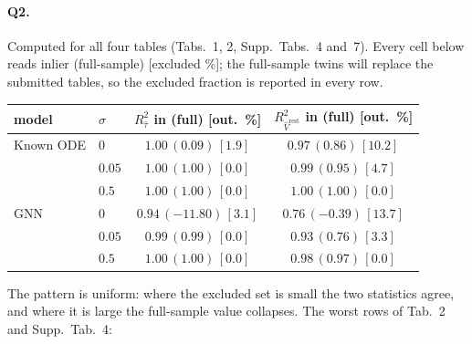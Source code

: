 
\paragraph{Q2.}
Computed for all four tables (Tabs.~1, 2, Supp.~Tabs.~4 and~7). Every cell below
reads inlier (full-sample) [excluded \%]; the full-sample twins will replace the
submitted tables, so the excluded fraction is reported in every row.

\begin{center}
{\footnotesize
\begin{tabular}{llcc}
\toprule
model & $\sigma$
  & $R^2_{\widehat{\tau}}$ in (full) [out.\ \%]
  & $R^2_{\widehat{V}^{\mathrm{rest}}}$ in (full) [out.\ \%] \\
\midrule
Known ODE & $0$    & $1.00\,(0.09)\,[1.9]$    & $0.97\,(0.86)\,[10.2]$ \\
          & $0.05$ & $1.00\,(1.00)\,[0.0]$    & $0.99\,(0.95)\,[4.7]$ \\
          & $0.5$  & $1.00\,(1.00)\,[0.0]$    & $1.00\,(1.00)\,[0.0]$ \\
\midrule
GNN       & $0$    & $0.94\,(-11.80)\,[3.1]$  & $0.76\,(-0.39)\,[13.7]$ \\
          & $0.05$ & $0.99\,(0.99)\,[0.0]$    & $0.93\,(0.76)\,[3.3]$ \\
          & $0.5$  & $1.00\,(1.00)\,[0.0]$    & $0.98\,(0.97)\,[0.0]$ \\
\bottomrule
\end{tabular}}
\end{center}

The pattern is uniform: where the excluded set is small the two statistics agree,
and where it is large the full-sample value collapses. The worst rows of Tab.~2
and Supp.~Tab.~4:

